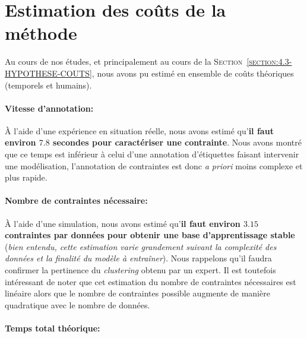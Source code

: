 	
	\newpage
	\section{Estimation des coûts de la méthode}
	\label{section:5.5-GUIDE-COUTS}
	
		Au cours de nos études, et principalement au cours de la \textsc{Section~\ref{section:4.3-HYPOTHESE-COUTS}}, nous avons pu estimé en ensemble de coûts théoriques (temporels et humains).
		
		
		\paragraph{\textcolor{colorSilverLakeBlue}{\faCheckSquare} Vitesse d'annotation:}
			
			À l'aide d'une expérience en situation réelle, nous avons estimé qu'\textbf{il faut environ $7.8$ secondes pour caractériser une contrainte}.
			Nous avons montré que ce temps est inférieur à celui d'une annotation d'étiquettes faisant intervenir une modélisation, l'annotation de contraintes est donc \textit{a priori} moins complexe et plus rapide.
		
		
		\paragraph{\textcolor{colorSilverLakeBlue}{\faCheckSquare} Nombre de contraintes nécessaire:}
		
			À l'aide d'une simulation, nous avons estimé qu'\textbf{il faut environ $3.15$ contraintes par données pour obtenir une base d'apprentissage stable} (\textit{bien entendu, cette estimation varie grandement suivant la complexité des données et la finalité du modèle à entraîner}).
			Nous rappelons qu'il faudra confirmer la pertinence du \textit{clustering} obtenu par un expert.
			Il est toutefois intéressant de noter que cet estimation du nombre de contraintes nécessaires est linéaire alors que le nombre de contraintes possible augmente de manière quadratique avec le nombre de données.
		
		
		\paragraph{\textcolor{colorSilverLakeBlue}{\faCheckSquare} Temps total théorique:}
		
